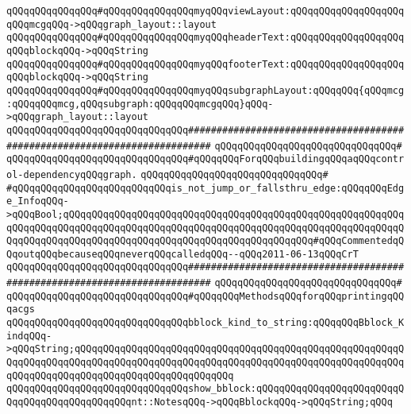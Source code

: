 \verb|qQQqqQQqqQQqqQQq#qQQqqQQqqQQqqQQqmyqQQqviewLayout:qQQqqQQqqQQqqQQqqQQqqQQqmcgqQQq->qQQqgraph_layout::layout|\newline
\verb|qQQqqQQqqQQqqQQq#qQQqqQQqqQQqqQQqmyqQQqheaderText:qQQqqQQqqQQqqQQqqQQqqQQqblockqQQq->qQQqString|\newline
\verb|qQQqqQQqqQQqqQQq#qQQqqQQqqQQqqQQqmyqQQqfooterText:qQQqqQQqqQQqqQQqqQQqqQQqblockqQQq->qQQqString|\newline
\verb|qQQqqQQqqQQqqQQq#qQQqqQQqqQQqqQQqmyqQQqsubgraphLayout:qQQqqQQq{qQQqmcg:qQQqqQQqmcg,qQQqsubgraph:qQQqqQQqmcgqQQq}qQQq->qQQqgraph_layout::layout|\newline
\newline
\newline
\newline
\verb|qQQqqQQqqQQqqQQqqQQqqQQqqQQqqQQq##########################################################################|\newline
\verb|qQQqqQQqqQQqqQQqqQQqqQQqqQQqqQQq#|\newline
\verb|qQQqqQQqqQQqqQQqqQQqqQQqqQQqqQQq#qQQqqQQqForqQQqbuildingqQQqaqQQqcontrol-dependencyqQQqgraph.|\newline
\verb|qQQqqQQqqQQqqQQqqQQqqQQqqQQqqQQq#|\newline
\verb|#qQQqqQQqqQQqqQQqqQQqqQQqqQQqis_not_jump_or_fallsthru_edge:qQQqqQQqEdge_InfoqQQq->qQQqBool;qQQqqQQqqQQqqQQqqQQqqQQqqQQqqQQqqQQqqQQqqQQqqQQqqQQqqQQqqQQqqQQqqQQqqQQqqQQqqQQqqQQqqQQqqQQqqQQqqQQqqQQqqQQqqQQqqQQqqQQqqQQqqQQqqQQqqQQqqQQqqQQqqQQqqQQqqQQqqQQqqQQqqQQqqQQqqQQqqQQqqQQq#qQQqCommentedqQQqoutqQQqbecauseqQQqneverqQQqcalledqQQq--qQQq2011-06-13qQQqCrT|\newline
\newline
\newline
\verb|qQQqqQQqqQQqqQQqqQQqqQQqqQQqqQQq##########################################################################|\newline
\verb|qQQqqQQqqQQqqQQqqQQqqQQqqQQqqQQq#|\newline
\verb|qQQqqQQqqQQqqQQqqQQqqQQqqQQqqQQq#qQQqqQQqMethodsqQQqforqQQqprintingqQQqacgs|\newline
\newline
\verb|qQQqqQQqqQQqqQQqqQQqqQQqqQQqqQQqbblock_kind_to_string:qQQqqQQqBblock_KindqQQq->qQQqString;qQQqqQQqqQQqqQQqqQQqqQQqqQQqqQQqqQQqqQQqqQQqqQQqqQQqqQQqqQQqqQQqqQQqqQQqqQQqqQQqqQQqqQQqqQQqqQQqqQQqqQQqqQQqqQQqqQQqqQQqqQQqqQQqqQQqqQQqqQQqqQQqqQQqqQQqqQQqqQQqqQQqqQQq|\newline
\verb|qQQqqQQqqQQqqQQqqQQqqQQqqQQqqQQqshow_bblock:qQQqqQQqqQQqqQQqqQQqqQQqqQQqqQQqqQQqqQQqqQQqqQQqnt::NotesqQQq->qQQqBblockqQQq->qQQqString;qQQq|\newline
